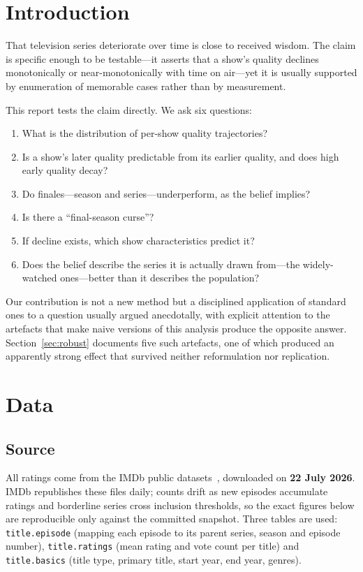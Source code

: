 \documentclass[11pt,a4paper]{article}
\begin{document}
\section{Introduction}

That television series deteriorate over time is close to received wisdom. The
claim is specific enough to be testable---it asserts that a show's quality
declines monotonically or near-monotonically with time on air---yet it is
usually supported by enumeration of memorable cases rather than by measurement.

This report tests the claim directly. We ask six questions:

\begin{enumerate}\itemsep2pt
  \item What is the distribution of per-show quality trajectories?
  \item Is a show's later quality predictable from its earlier quality, and
        does high early quality decay?
  \item Do finales---season and series---underperform, as the belief implies?
  \item Is there a ``final-season curse''?
  \item If decline exists, which show characteristics predict it?
  \item Does the belief describe the series it is actually drawn from---the
        widely-watched ones---better than it describes the population?
\end{enumerate}

Our contribution is not a new method but a disciplined application of standard
ones to a question usually argued anecdotally, with explicit attention to the
artefacts that make naive versions of this analysis produce the opposite
answer. Section~\ref{sec:robust} documents five such artefacts, one of which
produced an apparently strong effect that survived neither reformulation nor
replication.

\FloatBarrier
\section{Data}

\FloatBarrier
\subsection{Source}

All ratings come from the IMDb public datasets~\cite{imdb}, downloaded on
\textbf{22 July 2026}. IMDb republishes these files daily; counts drift as new
episodes accumulate ratings and borderline series cross inclusion thresholds,
so the exact figures below are reproducible only against the committed
snapshot. Three tables are used: \texttt{title.episode} (mapping each episode
to its parent series, season and episode number), \texttt{title.ratings} (mean
rating and vote count per title) and \texttt{title.basics} (title type,
primary title, start year, end year, genres).
\end{document}
